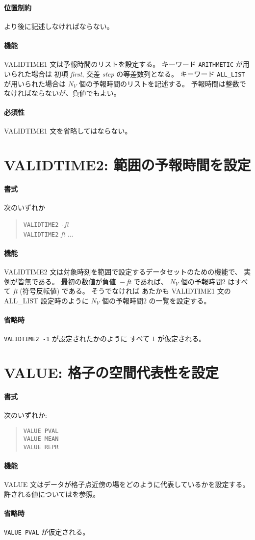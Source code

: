 \paragraph{位置制約}
 より後に記述しなければならない。
\paragraph{機能}
VALIDTIME1 文は予報時間のリストを設定する。
キーワード {\tt ARITHMETIC} が用いられた場合は
初項 {\it first}, 交差 {\it step} の等差数列となる。
キーワード {\tt ALL\_LIST} が用いられた場合は
$N_V$ 個の予報時間のリストを記述する。
予報時間は整数でなければならないが、負値でもよい。
\paragraph{必須性}
VALIDTIME1 文を省略してはならない。

\section{VALIDTIME2: 範囲の予報時間を設定}
\label{sec:def:VALIDTIME2}
\paragraph{書式}
次のいずれか
\begin{quote}
{\tt VALIDTIME2} {\tt -}{\it ft} \\
{\tt VALIDTIME2} {\it ft} ...
\end{quote}
\paragraph{機能}
VALIDTIME2 文は対象時刻を範囲で設定するデータセットのための機能で、
実例が皆無である。
最初の数値が負値 ${}-{}${\it ft} であれば、
$N_V$ 個の予報時間2 はすべて {\it ft} (符号反転値) である。
そうでなければ
あたかも VALIDTIME1 文の ALL\_LIST 設定時のように
$N_V$ 個の予報時間2 の一覧を設定する。
\paragraph{省略時}
{\tt VALIDTIME2 -1} が設定されたかのように
すべて $1$ が仮定される。

\section{VALUE: 格子の空間代表性を設定}
\label{sec:def:VALUE}
\paragraph{書式}
次のいずれか:
\begin{quote}
{\tt VALUE PVAL}\\
{\tt VALUE MEAN}\\
{\tt VALUE REPR}
\end{quote}
\paragraph{機能}
VALUE 文はデータが格子点近傍の場をどのように代表しているかを設定する。
許される値についてはを参照。

\paragraph{省略時}
{\tt VALUE PVAL} が仮定される。
